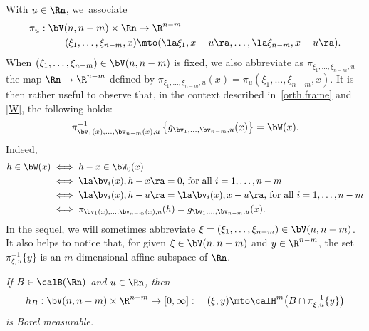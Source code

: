 \begin{Empty}
\label{pi.u}
With $u \in \Rn$, we~asso\-ciate
\begin{align*}
\pi_u: \bV(n,n-m) \times \Rn &\to \R^{n-m}\\
(\xi_1,\ldots,\xi_{n-m},x) &\mto(\la \xi_1,x-u\ra, \ldots, \la \xi_{n-m},x-u\ra).
\end{align*}
When $(\xi_1,\ldots,\xi_{n-m}) \in \bV(n,n-m)$ is fixed, we also abbreviate as $\pi_{\xi_1,\ldots,\xi_{n-m},u}$ the map $\Rn \to \R^{n-m}$ defined by $\pi_{\xi_1,\ldots,\xi_{n-m},u}(x) = \pi_u(\xi_1,\ldots,\xi_{n-m},x)$.
It is then rather useful to observe that, in the context described in~\ref{orth.frame} and \ref{W}, the following holds:
\begin{equation}
\label{eq.4}
\pi_{\bv_1(x),\ldots,\bv_{n-m}(x),u}^{-1}\left\{ g_{\bv_1,\ldots,\bv_{n-m},u}(x) \right\} = \bW(x).
\end{equation}
Indeed,
\begin{equation*}
\begin{split}
h \in \bW(x) & \iff h-x \in \bW_0(x) \\
& \iff \la \bv_i(x), h-x \ra = 0 \text{, for all } i=1,\ldots,n-m \\
& \iff \la \bv_i(x), h-u \ra = \la \bv_i(x), x-u \ra \text{, for all } i=1,\ldots,n-m \\
& \iff \pi_{\bv_1(x),\ldots,\bv_{n-m}(x),u}(h) = g_{\bv_1,\ldots,\bv_{n-m},u}(x).
\end{split}
\end{equation*}
In the sequel, we will sometimes abbreviate $\xi = (\xi_1,\ldots,\xi_{n-m}) \in \bV(n,n-m)$.
It also helps to notice that, for given $\xi \in \bV(n,n-m)$ and $y \in \R^{n-m}$, the set $\pi_{\xi,u}^{-1}\{y\}$ is an $m$-dimensional affine subspace of $\Rn$.
\end{Empty}

\begin{Empty}[]
\label{measurability}
{\it
If $B \in \calB(\Rn)$ and $u \in \Rn$, then
\begin{equation*}
h_{B}: \bV(n,n-m) \times \R^{n-m} \to [0,\infty]:\quad (\xi,y) \mto \calH^m\bigl(B \cap \pi_{\xi,u}^{-1}\{y\} \bigr)
\end{equation*}
is Borel measurable.
}
\end{Empty}


